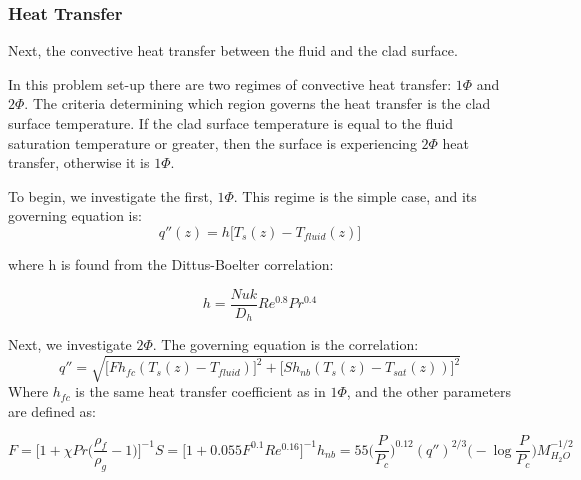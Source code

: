 \documentclass{article}
\begin{document}
\subsubsection{Heat Transfer}
Next, the convective heat transfer between the fluid and the clad surface. 

In this problem set-up there are two regimes of convective heat transfer: $1\Phi$ and $2\Phi$. The criteria determining which region governs the heat transfer is the clad surface temperature. If the clad surface temperature is equal to the fluid saturation temperature or greater, then the surface is experiencing $2\Phi$ heat transfer, otherwise it is $1\Phi$. 

To begin, we investigate the first, $1\Phi$. This regime is the simple case, and its governing equation is:
\begin{equation}
    q''(z) = h\bigr[T_{s}(z) - T_{fluid}(z)\bigr]
\end{equation}

where h is found from the Dittus-Boelter correlation:

\begin{equation}
    h = \frac{Nuk}{D_h}Re^{0.8}Pr^{0.4}
\end{equation}

Next, we investigate $2\Phi$. The governing equation is the correlation:
\begin{equation}
    q'' = \sqrt{\bigr[ Fh_{fc}(T_s(z) - T_{fluid})\bigr]^2 + \bigr[ Sh_{nb}(T_s(z) - T_{sat}(z))\bigr]^2} 
    \label{2phase}
\end{equation}
Where $h_{fc}$ is the same heat transfer coefficient as in $1\Phi$, and the other parameters are defined as:

\begin{subequations}
    \begin{equation}
        F = \biggr[ 1 + \chi Pr\biggr(\frac{\rho_f}{\rho_g} - 1\biggr)\biggr] ^{-1}
    \end{equation}  
    \begin{equation}
        S = \bigr[1 + 0.055F^{0.1}Re^{0.16}\bigr]^{-1}
    \end{equation}
    \begin{equation}
        h_{nb} = 55 \biggr(\frac{P}{P_c}\biggr)^{0.12}(q'')^{2/3}\biggr(-\log\frac{P}{P_c}\biggr)M_{H_2O}^{-1/2}
        \label{eq:hnb}
    \end{equation}
\end{subequations}
\end{document}
